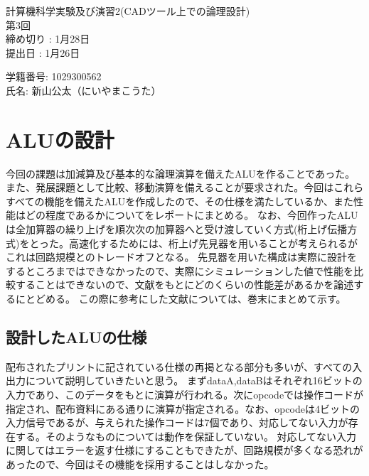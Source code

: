 \documentclass{jsarticle}
\begin{document}
\begin{titlepage}
    \begin{center}
        \vspace*{12pt}
        {\LARGE 計算機科学実験及び演習2(CADツール上での論理設計)}
        \vspace{12pt}\\
        {第3回}
        \vspace{60pt}\\
        {締め切り : 1月28日}
        \vspace{12pt}\\
        {提出日 : 1月26日}
    \end{center}

    \vspace{400pt}

    \begin{flushright}
       {\large 学籍番号: 1029300562\\
        氏名: 新山公太（にいやまこうた）}
    \end{flushright}

\end{titlepage}
\section{ALUの設計}
今回の課題は加減算及び基本的な論理演算を備えたALUを作ることであった。また、発展課題として比較、移動演算を備えることが要求された。今回はこれらすべての機能を備えたALUを作成したので、その仕様を満たしているか、また性能はどの程度であるかについてをレポートにまとめる。
なお、今回作ったALUは全加算器の繰り上げを順次次の加算器へと受け渡していく方式(桁上げ伝播方式)をとった。高速化するためには、桁上げ先見器を用いることが考えられるがこれは回路規模とのトレードオフとなる。
先見器を用いた構成は実際に設計をするところまではできなかったので、実際にシミュレーションした値で性能を比較することはできないので、文献をもとにどのくらいの性能差があるかを論述するにとどめる。
この際に参考にした文献については、巻末にまとめて示す。
\subsection{設計したALUの仕様}
配布されたプリントに記されている仕様の再掲となる部分も多いが、すべての入出力について説明していきたいと思う。
まずdataA,dataBはそれぞれ16ビットの入力であり、このデータをもとに演算が行われる。次にopcodeでは操作コードが指定され、配布資料にある通りに演算が指定される。なお、opcodeは4ビットの入力信号であるが、与えられた操作コードは7個であり、対応してない入力が存在する。そのようなものについては動作を保証していない。
対応してない入力に関してはエラーを返す仕様にすることもできたが、回路規模が多くなる恐れがあったので、今回はその機能を採用することはしなかった。
\end{document}
